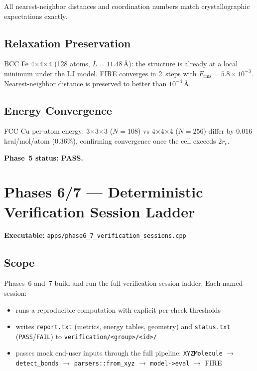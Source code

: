 \documentclass[11pt]{article}
\begin{document}
All nearest-neighbor distances and coordination numbers match
crystallographic expectations exactly.

\subsection{Relaxation Preservation}

BCC Fe 4$\times$4$\times$4 (128 atoms, $L = 11.48$\,\AA):
the structure is already at a local minimum under the LJ model.  FIRE
converges in 2~steps with $F_{\mathrm{rms}} = 5.8 \times 10^{-3}$.
Nearest-neighbor distance is preserved to better than $10^{-4}$\,\AA.

\subsection{Energy Convergence}

FCC Cu per-atom energy: 3$\times$3$\times$3 ($N=108$) vs
4$\times$4$\times$4 ($N=256$) differ by $0.016$\,kcal/mol/atom (0.36\%),
confirming convergence once the cell exceeds $2 r_c$.

\textbf{Phase~5 status: PASS.}

\section{Phases 6/7 --- Deterministic Verification Session Ladder}

\textbf{Executable:} \texttt{apps/phase6\_7\_verification\_sessions.cpp}

\subsection{Scope}

Phases~6 and~7 build and run the full verification session ladder.  Each
named session:
\begin{itemize}
\item runs a reproducible computation with explicit per-check thresholds
\item writes \texttt{report.txt} (metrics, energy tables, geometry) and
      \texttt{status.txt} (\texttt{PASS}/\texttt{FAIL}) to
      \texttt{verification/<group>/<id>/}
\item passes mock end-user inputs through the full pipeline:
      \texttt{XYZMolecule} $\to$ \texttt{detect\_bonds} $\to$
      \texttt{parsers::from\_xyz} $\to$ \texttt{model->eval} $\to$ FIRE
\end{itemize}
\end{document}
